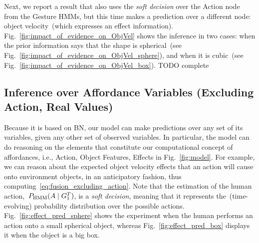 Next, we report a result that also uses the \emph{soft decision} over the Action node from the Gesture \acp{HMM}, but this time makes a prediction over a different node: object velocity~(which expresses an effect information).
Fig.~\ref{fig:impact_of_evidence_on_ObjVel} shows the inference in two cases: when the prior information says that the shape is spherical~(see Fig.~\ref{fig:impact_of_evidence_on_ObjVel_sphere}), and when it is cubic~(see Fig.~\ref{fig:impact_of_evidence_on_ObjVel_box}).
TODO complete

\subsection{Inference over Affordance Variables (Excluding Action, Real Values)}

Because it is based on \ac{BN}, our model can make predictions over any set of its variables, given any other set of observed variables.
In particular, the model can do reasoning on the elements that constitute our computational concept of affordances, i.e., Action, Object Features, Effects in Fig.~\ref{fig:model}.
For example, we can reason about the expected object velocity effects that an action will cause onto environment objects, in an anticipatory fashion, thus computing~\eqref{eq:fusion_excluding_action}.
Note that the estimation of the human action,~$P_{\text{HMM}}(A \mid G_1^T)$, is a \emph{soft decision}, meaning that it represents the~(time-evolving) probability distribution over the possible actions.
Fig.~\ref{fig:effect_pred_sphere} shows the experiment when the human performs an action onto a small spherical object, whereas Fig.~\ref{fig:effect_pred_box} displays it when the object is a big box.


